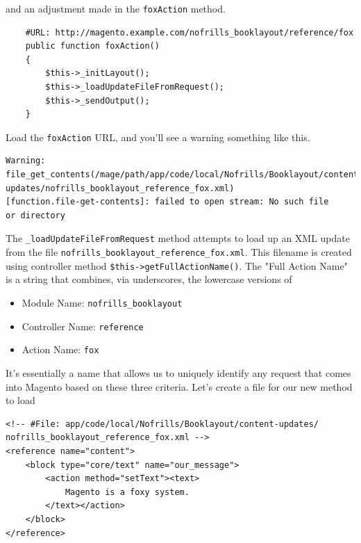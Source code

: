 \documentclass[oneside]{book}
\begin{document}
and an adjustment made in the \footnotesize\texttt{foxAction} \normalsize  method.

\begin{lstlisting}
    #URL: http://magento.example.com/nofrills_booklayout/reference/fox
    public function foxAction()
    {
        $this->_initLayout();
        $this->_loadUpdateFileFromRequest();
        $this->_sendOutput();
    }

\end{lstlisting}


Load the \footnotesize\texttt{foxAction} \normalsize  URL, and you'll see a warning something like this.

\begin{lstlisting}
Warning: file_get_contents(/mage/path/app/code/local/Nofrills/Booklayout/content-
updates/nofrills_booklayout_reference_fox.xml) 
[function.file-get-contents]: failed to open stream: No such file 
or directory

\end{lstlisting}


The \footnotesize\texttt{\_loadUpdateFileFromRequest} \normalsize  method attempts to load up an XML update from the file \footnotesize\texttt{nofrills\_booklayout\_reference\_fox.xml}\normalsize.  This filename is created using controller method \footnotesize\texttt{\$this-\textgreater getFullActionName()}\normalsize.  The "Full Action Name" is a string that combines, via underscores, the lowercase versions of 

\begin{itemize}
\item Module Name: \footnotesize\texttt{nofrills\_booklayout} \normalsize 
\item Controller Name: \footnotesize\texttt{reference} \normalsize 
\item Action Name: \footnotesize\texttt{fox} \normalsize 
\end{itemize}


It's essentially a name that allows us to uniquely identify any request that comes into Magento based on these three criteria.  Let's create a file for our new method to load

\begin{lstlisting}
<!-- #File: app/code/local/Nofrills/Booklayout/content-updates/
nofrills_booklayout_reference_fox.xml -->   
<reference name="content">
    <block type="core/text" name="our_message">
        <action method="setText"><text>
            Magento is a foxy system.
        </text></action>
    </block>
</reference>    

\end{lstlisting}
\end{document}
